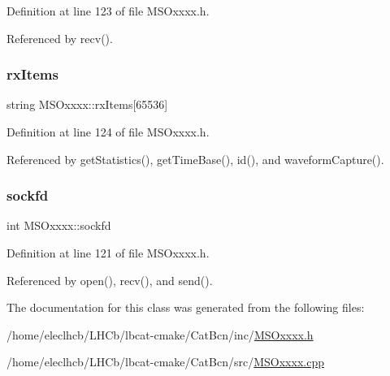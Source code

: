 Definition at line 123 of file M\+S\+Oxxxx.\+h.



Referenced by recv().

\mbox{\label{classMSOxxxx_a847cae37181e9ec5f481edcc3fb19b1a}} 
\subsubsection{\texorpdfstring{rx\+Items}{rxItems}}
{\footnotesize\ttfamily string M\+S\+Oxxxx\+::rx\+Items\mbox{[}65536\mbox{]}\hspace{0.3cm}{\ttfamily [private]}}



Definition at line 124 of file M\+S\+Oxxxx.\+h.



Referenced by get\+Statistics(), get\+Time\+Base(), id(), and waveform\+Capture().

\mbox{\label{classMSOxxxx_acf030a8f1ddd78d632816c856f50455c}} 
\subsubsection{\texorpdfstring{sockfd}{sockfd}}
{\footnotesize\ttfamily int M\+S\+Oxxxx\+::sockfd\hspace{0.3cm}{\ttfamily [private]}}



Definition at line 121 of file M\+S\+Oxxxx.\+h.



Referenced by open(), recv(), and send().



The documentation for this class was generated from the following files\+:\begin{DoxyCompactItemize}
\item 
/home/eleclhcb/\+L\+H\+Cb/lbcat-\/cmake/\+Cat\+Bcn/inc/\hyperlink{MSOxxxx_8h}{M\+S\+Oxxxx.\+h}\item 
/home/eleclhcb/\+L\+H\+Cb/lbcat-\/cmake/\+Cat\+Bcn/src/\hyperlink{MSOxxxx_8cpp}{M\+S\+Oxxxx.\+cpp}\end{DoxyCompactItemize}
